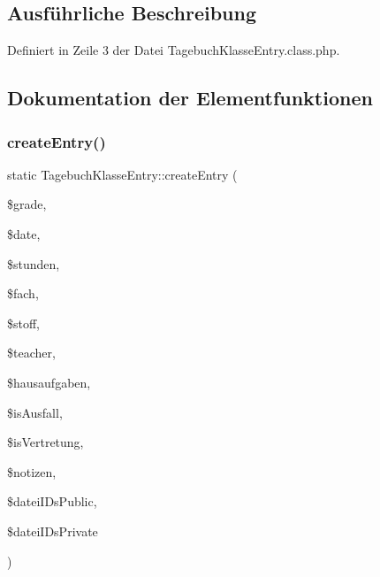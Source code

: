 \subsection{Ausführliche Beschreibung}


Definiert in Zeile 3 der Datei Tagebuch\+Klasse\+Entry.\+class.\+php.



\subsection{Dokumentation der Elementfunktionen}
\mbox{\label{class_tagebuch_klasse_entry_ad7e4d249134650c99710220ea326e258}} 
\subsubsection{\texorpdfstring{create\+Entry()}{createEntry()}}
{\footnotesize\ttfamily static Tagebuch\+Klasse\+Entry\+::create\+Entry (\begin{DoxyParamCaption}\item[{}]{\$grade,  }\item[{}]{\$date,  }\item[{}]{\$stunden,  }\item[{}]{\$fach,  }\item[{}]{\$stoff,  }\item[{}]{\$teacher,  }\item[{}]{\$hausaufgaben,  }\item[{}]{\$is\+Ausfall,  }\item[{}]{\$is\+Vertretung,  }\item[{}]{\$notizen,  }\item[{}]{\$datei\+I\+Ds\+Public,  }\item[{}]{\$datei\+I\+Ds\+Private }\end{DoxyParamCaption})\hspace{0.3cm}{\ttfamily [static]}}


